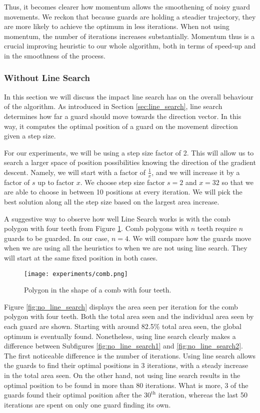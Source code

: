Thus, it becomes clearer how momentum allows the smoothening of noisy guard movements. We reckon that because guards are holding a steadier trajectory, they are more likely to achieve the optimum in less iterations. When not using momentum, the number of iterations increases substantially. Momentum thus is a crucial improving heuristic to our whole algorithm, both in terms of speed-up and in the smoothness of the process.

\subsubsection{Without Line Search}
In this section we will discuss the impact line search has on the overall behaviour of the algorithm. As introduced in Section \ref{sec:line_search}, line search determines how far a guard should move towards the direction vector. In this way, it computes the optimal position of a guard on the movement direction given a step size.

For our experiments, we will be using a step size factor of 2. This will allow us to search a larger space of position possibilities knowing the direction of the gradient descent. 
Namely, we will start with a factor of $\frac 1 x$, and we will increase it by a factor of $s$ up to factor $x$. We choose step size factor $s = 2$ and $x = 32$ so that we are able to choose in between 10 positions at every iteration. We will pick the best solution along all the step size based on the largest area increase. 

A suggestive way to observe how well Line Search works is with the comb polygon with four teeth from Figure \ref{fig:comb}. Comb polygons with $n$ teeth require $n$ guards to be guarded. In our case, $n = 4$. We will compare how the guards move when we are using all the heuristics to when we are not using line search. They will start at the same fixed position in both cases.

\begin{figure}[h!]
    \centering
    \texttt{[image: experiments/comb.png]}
    \caption{Polygon in the shape of a comb with four teeth.}
    \label{fig:comb}
\end{figure}

Figure \ref{fig:no_line_search} displays the area seen per iteration for the comb polygon with four teeth. Both the total area seen and the individual area seen by each guard are shown. Starting with around 82.5\% total area seen, the global optimum is eventually found. Nonetheless, using line search clearly makes a difference between Subfigures \ref{fig:no_line_search1} and \ref{fig:no_line_search2}. The first noticeable difference is the number of iterations. Using line search allows the guards to find their optimal positions in 3 iterations, with a steady increase in the total area seen. On the other hand, not using line search results in the optimal position to be found in more than 80 iterations. What is more, 3 of the guards found their optimal position after the $30^{\text{th}}$ iteration, whereas the last 50 iterations are spent on only one guard finding its own.


